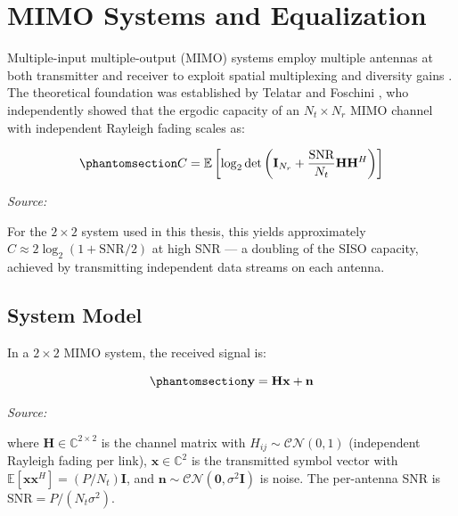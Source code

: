\section{MIMO Systems and Equalization}\label{sec:mimo-systems-and-equalization}

Multiple-input multiple-output (MIMO) systems employ multiple antennas at both transmitter and receiver to exploit spatial multiplexing and diversity gains \cite{tse2005fundamentals}. The theoretical foundation was established by Telatar \cite{telatar1999capacity} and Foschini \cite{foschini1996layered}, who independently showed that the ergodic capacity of an \(N_t \times N_r\) MIMO channel with independent Rayleigh fading scales as:

\begin{equation}\protect\phantomsection\label{eq:mimo-capacity}{C = \mathbb{E}\left[\log_2 \det\left(\mathbf{I}_{N_r} + \frac{\text{SNR}}{N_t}\mathbf{H}\mathbf{H}^H\right)\right]
}\end{equation} \par{\small\textit{Source: \cite{telatar1999capacity, foschini1996layered}}}

For the \(2 \times 2\) system used in this thesis, this yields approximately \(C \approx 2\log_2(1 + \text{SNR}/2)\) at high SNR --- a doubling of the SISO capacity, achieved by transmitting independent data streams on each antenna.

\subsection{System Model}\label{sec:system-model}

In a \(2 \times 2\) MIMO system, the received signal is:

\begin{equation}\protect\phantomsection\label{eq:mimo-received}{\mathbf{y} = \mathbf{H}\mathbf{x} + \mathbf{n}
}\end{equation} \par{\small\textit{Source: \cite{tse2005fundamentals}}}

where \(\mathbf{H} \in \mathbb{C}^{2 \times 2}\) is the channel matrix with \(H_{ij} \sim \mathcal{CN}(0, 1)\) (independent Rayleigh fading per link), \(\mathbf{x} \in \mathbb{C}^{2}\) is the transmitted symbol vector with \(\mathbb{E}[\mathbf{x}\mathbf{x}^H] = (P/N_t)\mathbf{I}\), and \(\mathbf{n} \sim \mathcal{CN}(\mathbf{0}, \sigma^2\mathbf{I})\) is noise. The per-antenna SNR is \(\text{SNR} = P/(N_t \sigma^2)\).

